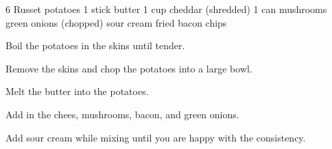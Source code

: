 \dishtype{}
\begin{ingreds}
    6 Russet potatoes
    1 stick butter
    1 cup cheddar (shredded)
    1 can mushrooms
    green onions (chopped)
    sour cream
    fried bacon chips
\end{ingreds}
\begin{method}
    Boil the potatoes in the skins until tender.\par
    Remove the skins and chop the potatoes into a large bowl.\par
    Melt the butter into the potatoes.\par
    Add in the chees, mushrooms, bacon, and green onions.\par
    Add sour cream while mixing until you are happy with the consistency.
\end{method}
